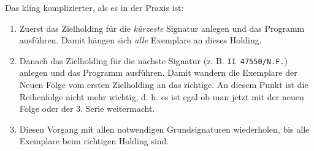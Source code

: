 \documentclass[10pt, a4paper]{scrartcl}
\begin{document}
Das kling komplizierter, als es in der Praxis ist:

\begin{enumerate}
\item Zuerst das Zielholding für die \emph{kürzeste} Signatur anlegen und das
Programm ausführen. Damit hängen sich \emph{alle} Exemplare an dieses
Holding.
\item Danach das Zielholding für die nächste Signatur (z. B. \texttt{II 47550/N.F.})
anlegen und das Programm ausführen. Damit wandern die Exemplare der
Neuen Folge vom ersten Zielholding an das richtige. An diesem Punkt ist
die Reihenfolge nicht mehr wichtig, d. h. es ist egal ob man jetzt mit
der neuen Folge oder der 3. Serie weitermacht.
\item Diesen Vorgang mit allen notwendigen Grundsignaturen wiederholen, bis alle
Exemplare beim richtigen Holding sind.
\end{enumerate}
\end{document}
